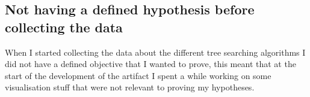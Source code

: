\documentclass[journal]{IEEEtran}
\begin{document}
		\subsection{Not having a defined hypothesis before collecting the data}
			When I started collecting the data about the different tree searching algorithms I did not have a defined objective that I wanted to prove, this meant that at the start of the development of the artifact I spent a while working on some visualisation stuff that were not relevant to proving my hypotheses.








\end{document}

